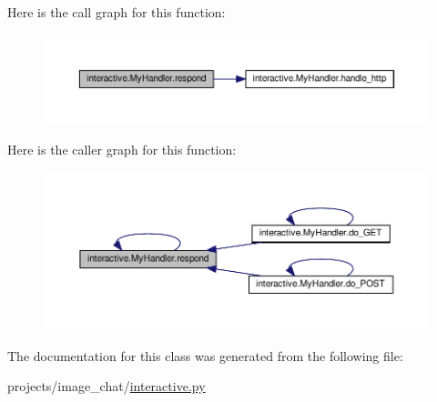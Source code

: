 Here is the call graph for this function\+:
\nopagebreak
\begin{figure}[H]
\begin{center}
\leavevmode
\includegraphics[width=350pt]{classinteractive_1_1MyHandler_a90d22dc71dcfeeedcb3c6d4ce61cccf1_cgraph}
\end{center}
\end{figure}
Here is the caller graph for this function\+:
\nopagebreak
\begin{figure}[H]
\begin{center}
\leavevmode
\includegraphics[width=350pt]{classinteractive_1_1MyHandler_a90d22dc71dcfeeedcb3c6d4ce61cccf1_icgraph}
\end{center}
\end{figure}


The documentation for this class was generated from the following file\+:\begin{DoxyCompactItemize}
\item 
projects/image\+\_\+chat/\hyperlink{projects_2image__chat_2interactive_8py}{interactive.\+py}\end{DoxyCompactItemize}

